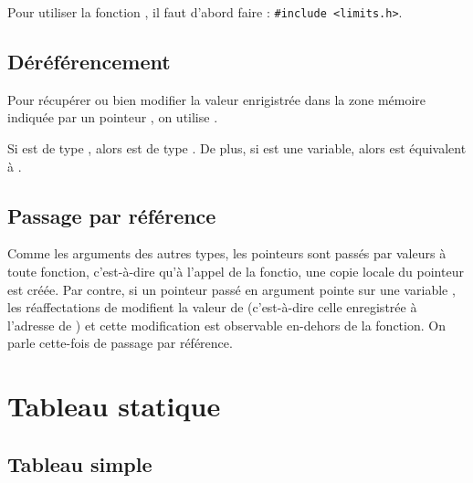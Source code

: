 		\begin{Exemples}
			
		\end{Exemples}
	
		\begin{Remarque}
			Pour utiliser la fonction , il faut d'abord faire : \texttt{#include <limits.h>}.
		\end{Remarque}
	
	\subsection{Déréférencement}
	
		Pour récupérer ou bien modifier la valeur enrigistrée dans la zone mémoire indiquée par un pointeur , on utilise \cc{*p}.
		
		\vs{2}
		\begin{Exemple}
			
		\end{Exemple}
	
		\vs{2}
		\begin{Remarque}
			Si  est de type , alors  est de type . De plus, si  est une variable, alors  est équivalent à \cc{var}.
		\end{Remarque}
	
	\subsection{Passage par référence}
		
		\vs{-2}
		\begin{Definition}
		Comme les arguments des autres types, les pointeurs sont passés par valeurs à toute fonction, c'est-à-dire qu'à l'appel de la fonctio, une copie locale du pointeur est créée. \nll
		Par contre, si un pointeur  passé en argument pointe sur une variable , les réaffectations de  modifient la valeur de  (c'est-à-dire celle enregistrée à l'adresse de ) et cette modification est observable en-dehors de la fonction. \nt
		On parle cette-fois de passage par référence.
		\end{Definition}
		
\section{Tableau statique}

	\subsection{Tableau simple}
	 	
